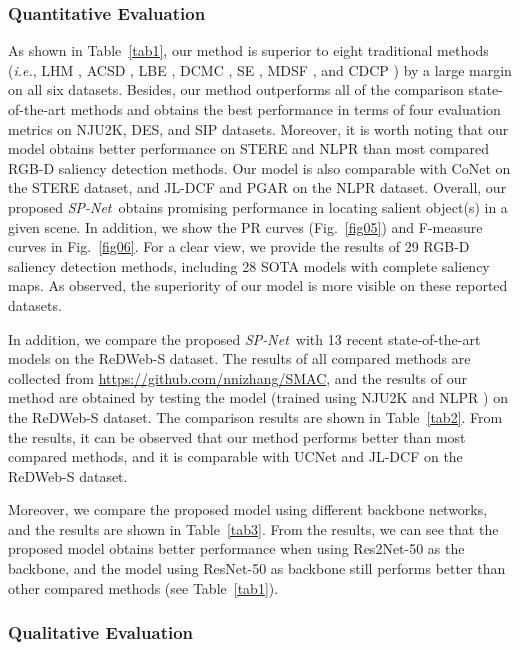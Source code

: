 \documentclass[10pt,twocolumn,letterpaper]{article}
\def\ie{\emph{i.e.}}
\def\ours{\emph{SP-Net}}
\begin{document}
\subsubsection{Quantitative Evaluation}

As shown in Table~\ref{tab1}, our method is superior to eight traditional methods (\ie, LHM \cite{peng2014rgbd}, ACSD \cite{ju2014depth}, LBE \cite{feng2016local}, DCMC \cite{cong2016saliency}, SE \cite{guo2016salient}, MDSF \cite{song2017depth}, and CDCP \cite{zhu2017innovative}) by a large margin on all six datasets. Besides, our method outperforms all of the comparison state-of-the-art methods and obtains the best performance in terms of four evaluation metrics on NJU2K, DES, and SIP datasets. Moreover, it is worth noting that our model obtains better performance on STERE and NLPR than most compared RGB-D saliency detection methods. Our model is also comparable with CoNet on the STERE dataset, and JL-DCF and PGAR on the NLPR dataset. Overall, our proposed \ours~obtains promising performance in locating salient object(s) in a given scene. In addition, we show the PR curves \cite{borji2015salient} (Fig.~\ref{fig05}) and F-measure curves in Fig.~\ref{fig06}. For a clear view, we provide the results of 29 RGB-D saliency detection methods, including 28 SOTA models with complete saliency maps. As observed, the superiority of our model is more visible on these reported datasets.

In addition, we compare the proposed \ours~with 13 recent state-of-the-art models on the ReDWeb-S dataset. The results of all compared methods are collected from \url{https://github.com/nnizhang/SMAC}, and the results of our method are obtained by testing the model (trained using NJU2K \cite{ju2014depth} and NLPR \cite{peng2014rgbd}) on the ReDWeb-S dataset. The comparison results are shown in Table~\ref{tab2}. From the results, it can be observed that our method performs better than most compared methods, and it is comparable with UCNet and JL-DCF on the ReDWeb-S dataset.


Moreover, we compare the proposed model using different backbone networks, and the results are shown in Table~\ref{tab3}. From the results, we can see that the proposed model obtains better performance when using Res2Net-50 as the backbone, and the model using ResNet-50 as backbone still performs better than other compared methods (see Table~\ref{tab1}).



\subsubsection{Qualitative Evaluation}
\end{document}
